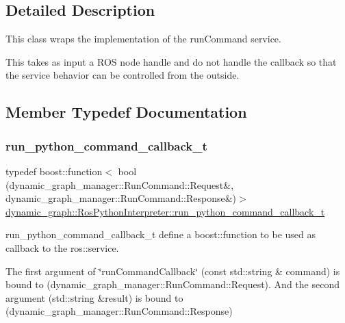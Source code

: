 \subsection{Detailed Description}
This class wraps the implementation of the run\+Command service. 

This takes as input a R\+OS node handle and do not handle the callback so that the service behavior can be controlled from the outside. 

\subsection{Member Typedef Documentation}
\mbox{\label{classdynamic__graph_1_1RosPythonInterpreter_aa9fcb34973d84db722fa39803d11c00d}} 
\subsubsection{\texorpdfstring{run\+\_\+python\+\_\+command\+\_\+callback\+\_\+t}{run\_python\_command\_callback\_t}}
{\footnotesize\ttfamily typedef boost\+::function$<$ bool (dynamic\+\_\+graph\+\_\+manager\+::\+Run\+Command\+::\+Request\&, dynamic\+\_\+graph\+\_\+manager\+::\+Run\+Command\+::\+Response\&)$>$ \hyperlink{classdynamic__graph_1_1RosPythonInterpreter_aa9fcb34973d84db722fa39803d11c00d}{dynamic\+\_\+graph\+::\+Ros\+Python\+Interpreter\+::run\+\_\+python\+\_\+command\+\_\+callback\+\_\+t}}



run\+\_\+python\+\_\+command\+\_\+callback\+\_\+t define a boost\+::function to be used as callback to the ros\+::service. 

The first argument of \char`\"{}run\+Command\+Callback\char`\"{} (const std\+::string \& command) is bound to (dynamic\+\_\+graph\+\_\+manager\+::\+Run\+Command\+::\+Request). And the second argument (std\+::string \&result) is bound to (dynamic\+\_\+graph\+\_\+manager\+::\+Run\+Command\+::\+Response) \mbox{\label{classdynamic__graph_1_1RosPythonInterpreter_a802128e670817aa48dd8db54830a7977}} 

